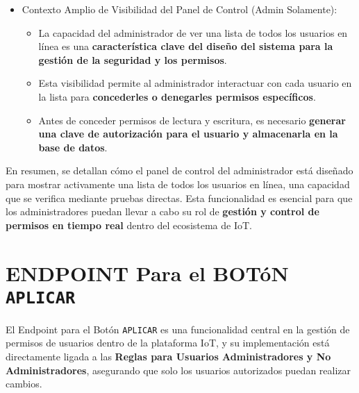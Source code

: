 \documentclass{report}
\begin{document}
\begin{itemize}
    \item Contexto Amplio de Visibilidad del Panel de Control (Admin Solamente):
    \begin{itemize}
        \item La capacidad del administrador de ver una lista de todos los usuarios en línea es una \textbf{característica clave del diseño del sistema para 
              la gestión de la seguridad y los permisos}.
        \item Esta visibilidad permite al administrador interactuar con cada usuario en la lista para \textbf{concederles o denegarles permisos específicos}.
        \item Antes de conceder permisos de lectura y escritura, es necesario \textbf{generar una clave de autorización para el usuario y almacenarla en la 
              base de datos}.
    \end{itemize}
\end{itemize}

En resumen, se  detallan cómo el panel de control del administrador está diseñado para mostrar activamente una lista de todos los usuarios en 
línea, una capacidad que se verifica mediante pruebas directas. Esta funcionalidad es esencial para que los administradores puedan llevar a cabo su rol 
de \textbf{gestión y control de permisos en tiempo real} dentro del ecosistema de IoT.

\section{ENDPOINT Para el BOTóN \texttt{APLICAR}}
El Endpoint para el Botón \texttt{APLICAR} es una funcionalidad central en la gestión de permisos de usuarios dentro de la plataforma IoT, y su 
implementación está directamente ligada a las \textbf{Reglas para Usuarios Administradores y No Administradores}, asegurando que solo los usuarios autorizados 
puedan realizar cambios.
\end{document}
